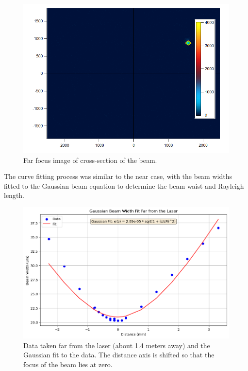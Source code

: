 \documentclass[12pt]{article}
\begin{document}
\begin{figure}[H]
    \centering
    \includegraphics[width=1\linewidth]{Far_Focus.png}
    \caption{Far focus image of cross-section of the beam.}
    \label{fig:far-focus}
\end{figure}

The curve fitting process was similar to the near case, with the beam widths fitted to the Gaussian beam equation to determine the beam waist and Rayleigh length.

\begin{figure}[H]
    \centering
    \includegraphics[width=1\linewidth]{Far_fit.png}
    \caption{Data taken far from the laser (about 1.4 meters away) and the Gaussian fit to the data. The distance axis is shifted so that the focus of the beam lies at zero.}
    \label{fig:far-fit}
\end{figure}
\end{document}
